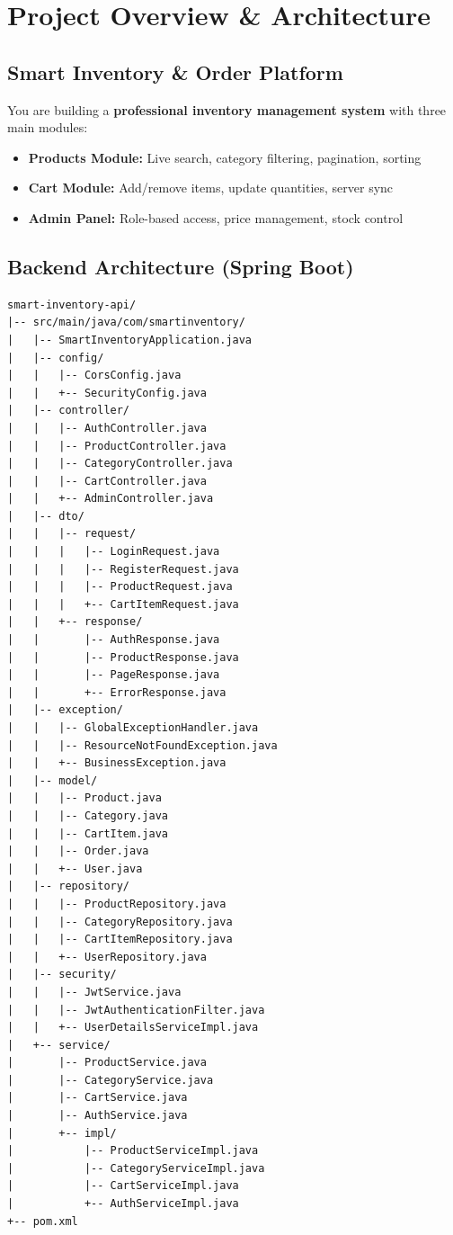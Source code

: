 \documentclass[12pt,a4paper]{report}
\begin{document}
\chapter{Project Overview \& Architecture}

\section{Smart Inventory \& Order Platform}

You are building a \textbf{professional inventory management system} with three main modules:

\begin{itemize}[leftmargin=2cm]
    \item[\faIcon{box}] \textbf{Products Module:} Live search, category filtering, pagination, sorting
    \item[\faIcon{shopping-cart}] \textbf{Cart Module:} Add/remove items, update quantities, server sync
    \item[\faIcon{lock}] \textbf{Admin Panel:} Role-based access, price management, stock control
\end{itemize}

\section{Backend Architecture (Spring Boot)}

\begin{lstlisting}[style=yamlstyle, title={Spring Boot Project Structure}]
smart-inventory-api/
|-- src/main/java/com/smartinventory/
|   |-- SmartInventoryApplication.java
|   |-- config/
|   |   |-- CorsConfig.java
|   |   +-- SecurityConfig.java
|   |-- controller/
|   |   |-- AuthController.java
|   |   |-- ProductController.java
|   |   |-- CategoryController.java
|   |   |-- CartController.java
|   |   +-- AdminController.java
|   |-- dto/
|   |   |-- request/
|   |   |   |-- LoginRequest.java
|   |   |   |-- RegisterRequest.java
|   |   |   |-- ProductRequest.java
|   |   |   +-- CartItemRequest.java
|   |   +-- response/
|   |       |-- AuthResponse.java
|   |       |-- ProductResponse.java
|   |       |-- PageResponse.java
|   |       +-- ErrorResponse.java
|   |-- exception/
|   |   |-- GlobalExceptionHandler.java
|   |   |-- ResourceNotFoundException.java
|   |   +-- BusinessException.java
|   |-- model/
|   |   |-- Product.java
|   |   |-- Category.java
|   |   |-- CartItem.java
|   |   |-- Order.java
|   |   +-- User.java
|   |-- repository/
|   |   |-- ProductRepository.java
|   |   |-- CategoryRepository.java
|   |   |-- CartItemRepository.java
|   |   +-- UserRepository.java
|   |-- security/
|   |   |-- JwtService.java
|   |   |-- JwtAuthenticationFilter.java
|   |   +-- UserDetailsServiceImpl.java
|   +-- service/
|       |-- ProductService.java
|       |-- CategoryService.java
|       |-- CartService.java
|       |-- AuthService.java
|       +-- impl/
|           |-- ProductServiceImpl.java
|           |-- CategoryServiceImpl.java
|           |-- CartServiceImpl.java
|           +-- AuthServiceImpl.java
+-- pom.xml
\end{lstlisting}
\end{document}
